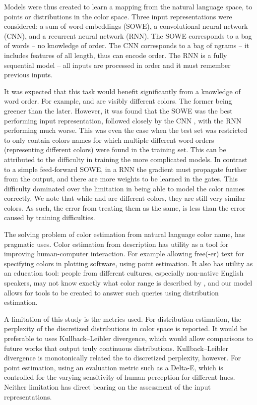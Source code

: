 \documentclass{book}
\begin{document}
Models were thus created to learn a mapping from the natural language space, to points or distributions in the color space.
Three input representations were considered: a sum of word embeddings (SOWE), a convolutional neural network (CNN), and a recurrent neural network (RNN).
The SOWE corresponds to a bag of words -- no knowledge of order.
The CNN corresponds to a bag of ngrams -- it includes features of all length, thus can encode order.
The RNN is a fully sequential model -- all inputs are processed in order and it must remember previous inputs.

It was expected that this task would benefit significantly from a knowledge of word order.
For example,  and  are visibly different colors.
The former being greener than the later.
However, it was found that the SOWE was the best performing input representation, 
followed closely by the CNN , with the RNN performing much worse.
This was even the case when the test set was restricted to only contain colors names for which multiple different word orders (representing different colors) were found in the training set.
This can be attributed to the difficulty in training the more complicated models.
In contrast to a simple feed-forward SOWE, in a RNN the gradient must propagate further from the output,
and there are more weights to be learned in the gates.
This difficulty dominated over the limitation in being able to model the color names correctly.
We note that while  and  are different colors, they are still very similar colors.
As such, the error from treating them as the same, is less than the error caused by training difficulties.


The solving problem of color estimation from natural language color name, has pragmatic uses.
Color estimation from description has utility as a tool for improving human-computer interaction.
For example allowing free(-er) text for specifying colors in plotting software, using point estimation.
It also has utility as an education tool: people from different cultures, especially non-native English speakers, may not know exactly what color range is described by , and our model allows for tools to be created to answer such queries using distribution estimation.


A limitation of this study is the metrics used.
For distribution estimation, the perplexity of the discretized distributions in color space is reported.
It would be preferable to uses Kullback–Leibler divergence, which would allow comparisons to future works that output truly continuous distributions.
Kullback–Leibler divergence is monotonically related the to discretized perplexity, however.
For point estimation, using an evaluation metric such as a Delta-E, which is controlled for the varying sensitivity of human perception for different hues.
Neither limitation has direct bearing on the assessment of the input representations.
\end{document}
